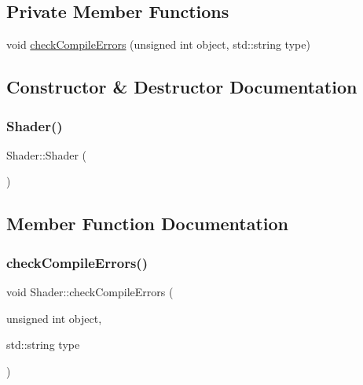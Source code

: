 \subsection*{Private Member Functions}
\begin{DoxyCompactItemize}
\item 
void \hyperlink{classShader_a9ef1a7e7fd62ef1de1a1c1f63dcdef8a}{check\+Compile\+Errors} (unsigned int object, std\+::string type)
\end{DoxyCompactItemize}


\subsection{Constructor \& Destructor Documentation}
\mbox{\label{classShader_a0d654ebaca4e0555197c0724c6d30610}} 
\subsubsection{\texorpdfstring{Shader()}{Shader()}}
{\footnotesize\ttfamily Shader\+::\+Shader (\begin{DoxyParamCaption}{ }\end{DoxyParamCaption})\hspace{0.3cm}{\ttfamily [inline]}}



\subsection{Member Function Documentation}
\mbox{\label{classShader_a9ef1a7e7fd62ef1de1a1c1f63dcdef8a}} 
\subsubsection{\texorpdfstring{check\+Compile\+Errors()}{checkCompileErrors()}}
{\footnotesize\ttfamily void Shader\+::check\+Compile\+Errors (\begin{DoxyParamCaption}\item[{unsigned int}]{object,  }\item[{std\+::string}]{type }\end{DoxyParamCaption})\hspace{0.3cm}{\ttfamily [private]}}

